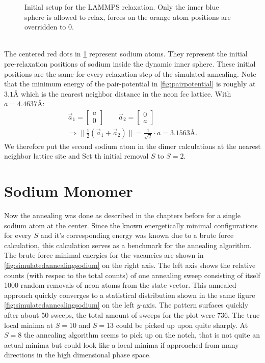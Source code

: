 \begin{figure}[h!]
	\caption{Initial setup for the \ac{LAMMPS} relaxation. Only the inner blue sphere is allowed to relax, forces on the orange atom positions are overridden to 0.}
	\label{fig:lammpssetup}
\end{figure}\\%
The centered red dots in \ref{fig:lammpssetup} represent sodium atoms. They represent the initial pre-relaxation positions of sodium inside the dynamic inner sphere. These initial positions are the same for every relaxation step of the simulated annealing. Note that the minimum energy of the pair-potential in \ref{fig:pairpotential} is roughly at $3\text{.}1\si{\angstrom}$ which is the nearest neighbor distance in the neon \ac{fcc} lattice. With $a = 4\text{.}4637\si{\angstrom}$: 
\begin{gather}
	\vec{a}_1=\begin{bmatrix}a\\0\end{bmatrix} \qquad \vec{a}_2=\begin{bmatrix}0\\a\end{bmatrix}\\
	\Rightarrow \|\frac{1}{2}\left(\vec{a}_1+\vec{a}_2\right)\|=\frac{1}{\sqrt{2}}\cdot a = 3\text{.}1563\si{\angstrom}.
\end{gather}  We therefore put the second sodium atom in the dimer calculations at the nearest neighbor lattice site and Set th initial removal $S$ to $S=2$. 
\section{Sodium Monomer}
Now the annealing was done as described in the chapters before for a single sodium atom at the center. Since the known energetically minimal configurations for every $S$ and it's corresponding energy was known due to a brute force calculation, this calculation serves as a benchmark for the annealing algorithm. The brute force minimal energies for the vacancies are shown in \ref{fig:simulatedannealingsodium} on the right axis. The left axis shows the relative counts (with respec to the total counts) of one annealing sweep consisting of itself 1000 random removals of neon atoms from the state vector. This annealed approach quickly converges to a statistical distribution shown in the same figure \ref{fig:simulatedannealingsodium} on the left $y$-axis. The pattern surfaces quickly after about 50 sweeps, the total amount of sweeps for the plot were 736. The true local minima at $S=10$ and $S=13$ could be picked up upon quite sharply. At $S=8$ the annealing algorithm seems to pick up on the notch, that is not quite an actual minima but could look like a local minima if approached from many directions in the high dimensional phase space.\\  


